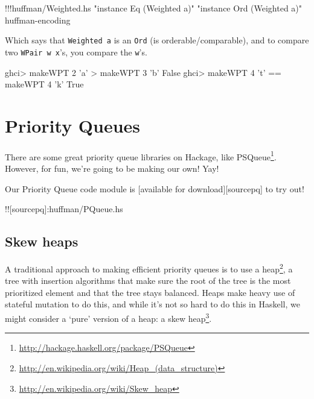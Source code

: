 \documentclass[]{article}
\newenvironment{Shaded}{}{}
\newcommand{\DataTypeTok}[1]{\textcolor[rgb]{0.56,0.13,0.00}{{#1}}}
\newcommand{\DecValTok}[1]{\textcolor[rgb]{0.25,0.63,0.44}{{#1}}}
\newcommand{\CharTok}[1]{\textcolor[rgb]{0.25,0.44,0.63}{{#1}}}
\newcommand{\StringTok}[1]{\textcolor[rgb]{0.25,0.44,0.63}{{#1}}}
\newcommand{\FunctionTok}[1]{\textcolor[rgb]{0.02,0.16,0.49}{{#1}}}
\newcommand{\NormalTok}[1]{{#1}}
\renewcommand{\href}[2]{#2\footnote{\url{#1}}}
\begin{document}
\begin{Shaded}
\begin{Highlighting}[]
\FunctionTok{!!!}\NormalTok{huffman}\FunctionTok{/}\NormalTok{Weighted.hs }\StringTok{"instance Eq (Weighted a)"} \StringTok{"instance Ord (Weighted a)"} \NormalTok{huffman}\FunctionTok{-}\NormalTok{encoding}
\end{Highlighting}
\end{Shaded}

Which says that \texttt{Weighted\ a} is an \texttt{Ord} (is
orderable/comparable), and to compare two \texttt{WPair\ w\ x}'s, you
compare the \texttt{w}'s.

\begin{Shaded}
\begin{Highlighting}[]
\NormalTok{ghci}\FunctionTok{>} \NormalTok{makeWPT }\DecValTok{2} \CharTok{'a'} \FunctionTok{>} \NormalTok{makeWPT }\DecValTok{3} \CharTok{'b'}
\DataTypeTok{False}
\NormalTok{ghci}\FunctionTok{>} \NormalTok{makeWPT }\DecValTok{4} \CharTok{'t'} \FunctionTok{==} \NormalTok{makeWPT }\DecValTok{4} \CharTok{'k'}
\DataTypeTok{True}
\end{Highlighting}
\end{Shaded}

\section{Priority Queues}\label{priority-queues}

There are some great priority queue libraries on Hackage, like
\href{http://hackage.haskell.org/package/PSQueue}{PSQueue}. However, for
fun, we're going to be making our own! Yay!

Our Priority Queue code module is {[}available for
download{]}{[}sourcepq{]} to try out!

!!{[}sourcepq{]}:huffman/PQueue.hs

\subsection{Skew heaps}\label{skew-heaps}

A traditional approach to making efficient priority queues is to use a
\href{http://en.wikipedia.org/wiki/Heap_(data_structure)}{heap}, a tree
with insertion algorithms that make sure the root of the tree is the
most prioritized element and that the tree stays balanced. Heaps make
heavy use of stateful mutation to do this, and while it's not so hard to
do this in Haskell, we might consider a `pure' version of a heap: a
\href{http://en.wikipedia.org/wiki/Skew_heap}{skew heap}.
\end{document}
